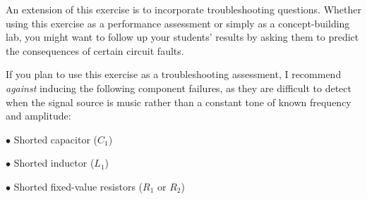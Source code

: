 An extension of this exercise is to incorporate troubleshooting questions.  Whether using this exercise as a performance assessment or simply as a concept-building lab, you might want to follow up your students' results by asking them to predict the consequences of certain circuit faults.

\vskip 10pt

If you plan to use this exercise as a troubleshooting assessment, I recommend {\it against} inducing the following component failures, as they are difficult to detect when the signal source is music rather than a constant tone of known frequency and amplitude:

\medskip
\goodbreak
\item{$\bullet$} Shorted capacitor ($C_1$)
\item{$\bullet$} Shorted inductor ($L_1$)
\item{$\bullet$} Shorted fixed-value resistors ($R_1$ or $R_2$)
\medskip




